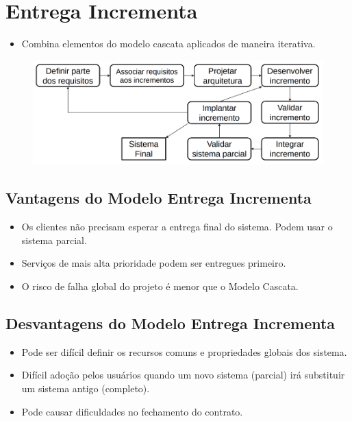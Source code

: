 \documentclass[a4paper, 11pt]{article}
\begin{document}
\section{Entrega Incrementa}
\begin{itemize}
    \item Combina elementos do modelo cascata aplicados de maneira iterativa.
\end{itemize}

\begin{figure}[h]
    \includegraphics[width=14cm]{modelo_entrega_incremental}
    \centering
\end{figure}

\subsection{Vantagens do Modelo Entrega Incrementa}
\begin{itemize}
    \item Os clientes não precisam esperar a entrega final do sistema. Podem usar o sistema parcial.
    \item Serviços de mais alta prioridade podem ser entregues primeiro.
    \item O risco de falha global do projeto é menor que o Modelo Cascata.
\end{itemize}

\subsection{Desvantagens do Modelo Entrega Incrementa}
\begin{itemize}
    \item Pode ser difícil definir os recursos comuns e propriedades globais dos sistema.
    \item Difícil adoção pelos usuários quando um novo sistema (parcial) irá substituir um sistema antigo (completo).
    \item Pode causar dificuldades no fechamento do contrato.
\end{itemize}
\end{document}
